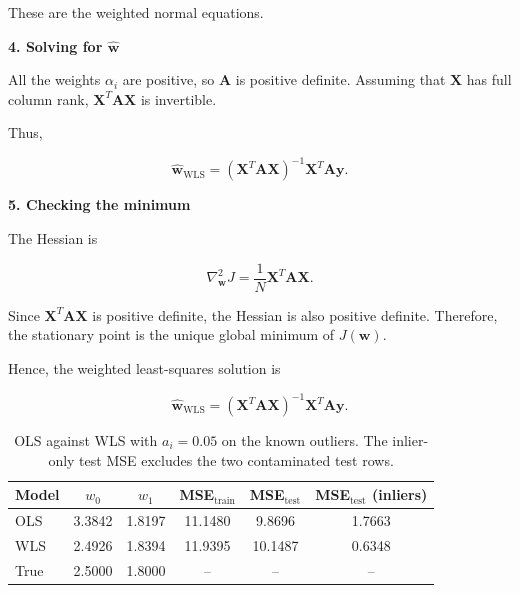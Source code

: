 \documentclass[12pt,a4paper]{article}
\begin{document}
These are the weighted normal equations.

\textbf{4. Solving for $\hat{\mathbf{w}}$}

All the weights $\alpha_i$ are positive, so $\mathbf{A}$ is positive definite. Assuming that
$\mathbf{X}$ has full column rank, $\mathbf{X}^T\mathbf{A}\mathbf{X}$ is invertible.

Thus,

\begin{equation}
\hat{\mathbf{w}}_{\mathrm{WLS}} =
(\mathbf{X}^T\mathbf{A}\mathbf{X})^{-1}\mathbf{X}^T\mathbf{A}\mathbf{y}.
\label{eq:wls}
\end{equation}

\textbf{5. Checking the minimum}

The Hessian is

\begin{equation*}
\nabla_{\mathbf{w}}^2 J = \frac{1}{N}\mathbf{X}^T\mathbf{A}\mathbf{X}.
\end{equation*}

Since $\mathbf{X}^T\mathbf{A}\mathbf{X}$ is positive definite, the Hessian is also positive
definite. Therefore, the stationary point is the unique global minimum of $J(\mathbf{w})$.

Hence, the weighted least-squares solution is

\begin{equation*}
\hat{\mathbf{w}}_{\mathrm{WLS}} =
(\mathbf{X}^T\mathbf{A}\mathbf{X})^{-1}\mathbf{X}^T\mathbf{A}\mathbf{y}.
\end{equation*}



\begin{table}[H]
\centering
\caption{OLS against WLS with $a_i = 0.05$ on the known outliers. The inlier-only test MSE
excludes the two contaminated test rows.}
\label{tab:wls}
\begin{tabular}{lccccc}
\toprule
\textbf{Model} & $w_0$ & $w_1$ & \textbf{MSE}$_{\text{train}}$ & \textbf{MSE}$_{\text{test}}$
& \textbf{MSE}$_{\text{test}}$ \textbf{(inliers)} \\
\midrule
OLS   & 3.3842 & 1.8197 & 11.1480 & 9.8696  & 1.7663 \\
WLS   & 2.4926 & 1.8394 & 11.9395 & 10.1487 & 0.6348 \\
True  & 2.5000 & 1.8000 & --      & --      & --     \\
\bottomrule
\end{tabular}
\end{table}
\end{document}
